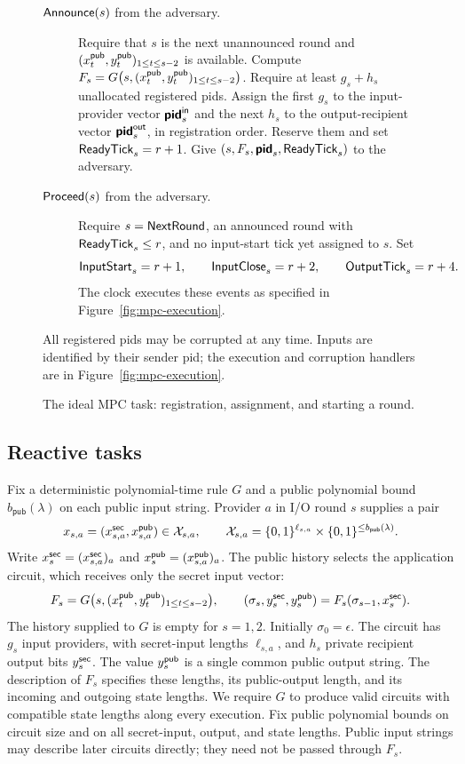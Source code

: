 \begin{figure}[!ht]
{\begin{minipage}{0.95\textwidth}
\begin{description}
  \item[$\mathsf{Announce}(s)$ from the adversary.]
    Require that $s$ is the next unannounced round and
    $(x^{\mathsf{pub}}_t,y^{\mathsf{pub}}_t)_{1\le t\le s-2}$ is available.
    Compute $F_s=G\bigl(s,(x^{\mathsf{pub}}_t,y^{\mathsf{pub}}_t)_{1\le t\le s-2}\bigr)$.
    Require at least $g_s+h_s$ unallocated registered pids.
    Assign the first $g_s$ to the input-provider vector
    $\boldsymbol{\mathsf{pid}}^{\mathsf{in}}_s$ and the next $h_s$ to the
    output-recipient vector $\boldsymbol{\mathsf{pid}}^{\mathsf{out}}_s$,
    in registration order.  Reserve them and set $\mathsf{ReadyTick}_s=r+1$.
    Give $(s,F_s,\boldsymbol{\mathsf{pid}}_s,\mathsf{ReadyTick}_s)$ to the adversary.

  \item[$\mathsf{Proceed}(s)$ from the adversary.]
    Require $s=\mathsf{NextRound}$, an announced round with
    $\mathsf{ReadyTick}_s\leq r$, and no input-start tick yet assigned to $s$.
    Set
    \[
      \mathsf{InputStart}_s=r+1,\qquad
      \mathsf{InputClose}_s=r+2,\qquad
      \mathsf{OutputTick}_s=r+4.
    \]
    The clock executes these events as specified in
    Figure~\ref{fig:mpc-execution}.
\end{description}
All registered pids may be corrupted at any time.  Inputs are identified
by their sender pid; the execution and corruption handlers are in
Figure~\ref{fig:mpc-execution}.
\end{minipage}}
\caption{The ideal MPC task: registration, assignment, and starting a round.}
\label{fig:mpc-registration}
\end{figure}

\subsection{Reactive tasks}
\label{sec:reactive-task}

Fix a deterministic polynomial-time rule $G$ and a public polynomial
bound $b_{\mathsf{pub}}(\lambda)$ on each public input string.
Provider $a$ in I/O round $s$ supplies a pair
\[
  x_{s,a}=(x^{\mathsf{sec}}_{s,a},x^{\mathsf{pub}}_{s,a})\in\mathcal X_{s,a},
  \qquad
  \mathcal X_{s,a}=\{0,1\}^{\ell_{s,a}}
      \times\{0,1\}^{\le b_{\mathsf{pub}}(\lambda)}.
\]
Write $x^{\mathsf{sec}}_s=(x^{\mathsf{sec}}_{s,a})_a$ and $x^{\mathsf{pub}}_s=(x^{\mathsf{pub}}_{s,a})_a$.
The public history selects the application circuit, which receives only
the secret input vector:
\[
  F_s=G\bigl(s,(x^{\mathsf{pub}}_t,y^{\mathsf{pub}}_t)_{1\le t\le s-2}\bigr),
  \qquad
  (\sigma_s,y^{\mathsf{sec}}_s,y^{\mathsf{pub}}_s)=F_s(\sigma_{s-1},x^{\mathsf{sec}}_s).
\]
The history supplied to $G$ is empty for $s=1,2$.
Initially $\sigma_0=\epsilon$.  The circuit has $g_s$ input providers,
with secret-input lengths $\ell_{s,a}$, and $h_s$ private recipient
output bits $y^{\mathsf{sec}}_s$.  The value $y^{\mathsf{pub}}_s$ is a single common public
output string.  The description of $F_s$ specifies these lengths, its
public-output length, and its incoming and outgoing state lengths.
We require $G$ to produce valid circuits with compatible state lengths
along every execution.  Fix public polynomial bounds on circuit size
and on all secret-input, output, and state lengths.
Public input strings may describe later circuits directly; they need
not be passed through $F_s$.

